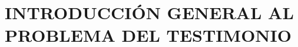 \documentclass[../main.tex]{subfiles}
\begin{document}
\setcounter{chapter}{0}

\chapter{INTRODUCCIÓN GENERAL AL PROBLEMA DEL TESTIMONIO}









%
\end{document}

